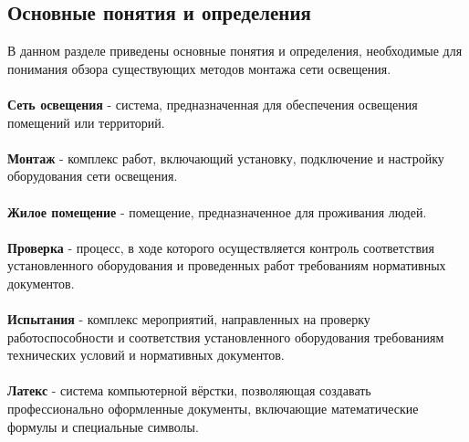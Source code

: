 \documentclass{article}
\begin{document}
\subsection{Основные понятия и определения}
В данном разделе приведены основные понятия и определения, необходимые для понимания обзора существующих методов монтажа сети освещения.\\
~\\
\textbf{Сеть освещения} - система, предназначенная для обеспечения освещения помещений или территорий.\\
~\\
\textbf{Монтаж} - комплекс работ, включающий установку, подключение и настройку оборудования сети освещения.\\
~\\
\textbf{Жилое помещение} - помещение, предназначенное для проживания людей.\\
~\\
\textbf{Проверка} - процесс, в ходе которого осуществляется контроль соответствия установленного оборудования и проведенных работ требованиям нормативных документов.\\
~\\
\textbf{Испытания} - комплекс мероприятий, направленных на проверку работоспособности и соответствия установленного оборудования требованиям технических условий и нормативных документов.\\
~\\
\textbf{Латекс} - система компьютерной вёрстки, позволяющая создавать профессионально оформленные документы, включающие математические формулы и специальные символы.
\end{document}
